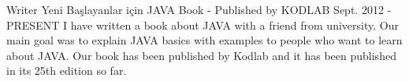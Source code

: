 
\begin{cventries}

    \cventry
    {Writer} %
    {Yeni Başlayanlar için JAVA} %
    {Book - Published by KODLAB} %
    {Sept. 2012 - PRESENT} %
    {
        I have written a book about JAVA with a friend from university. Our main goal was to explain JAVA basics with examples to people who want to learn about JAVA.
        Our book has been published by Kodlab and it has been published in its 25th edition so far.
    }

\end{cventries}
